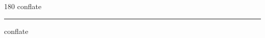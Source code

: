
\begin{frame}
\begin{center}
\begin{turn}{180}
{\fontsize{2.5cm}{1em}\selectfont conflate}
\end{turn}
\vspace{1em}\par  
\hrule
\vspace{1em}\par  
{\fontsize{2.5cm}{1em}\selectfont conflate}
\end{center}
\end{frame}
